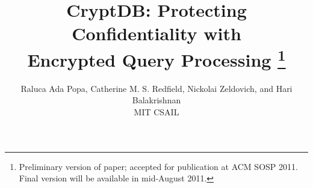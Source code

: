 \documentclass[9pt,twocolumn]{article}
\begin{document}
\title{\bf CryptDB: Protecting Confidentiality with \\
	   Encrypted Query Processing%
    \thanks{Preliminary version of paper; accepted for publication at ACM SOSP 2011.
	    Final version will be available in mid-August 2011.}}
\author{Raluca Ada Popa, Catherine M. S. Redfield,
	Nickolai Zeldovich, and Hari Balakrishnan \\
	MIT CSAIL}
\date{}

\newcommand{\RND}{\textrm{RND}}
\newcommand{\DET}{\textrm{DET}}
\newcommand{\OPE}{\textrm{OPE}}
\newcommand{\OPEJOIN}{\textrm{OPE-JOIN}}
\newcommand{\HOM}{\textrm{HOM}}
\newcommand{\JOIN}{\textrm{JOIN}}
\newcommand{\SEARCH}{\textrm{SEARCH}}

\newcommand{\up}{\texttt{UPDATE}}
\newcommand{\ins}{\texttt{INSERT}}
\newcommand{\del}{\texttt{DELETE}}
\newcommand{\sel}{\texttt{SELECT}}

\newcommand{\rap}[1]{\textcolor{blue}{RAP: #1}}
\newcommand{\hb}[1]{\textcolor{red}{HB: #1}}
\newcommand{\nz}[1]{\textcolor{magenta}{NZ: #1}}
\newcommand{\cmsr}[1]{\textcolor{green}{CR: #1}}
\newcommand{\todo}[1]{\textcolor{red}{#1}}


\newcommand{\tput}{27\%}

\newtheorem{definition}{Definition}
\newtheorem{theorem}{Theorem}

\maketitle







 





\balance
{
\small
\setlength{\bibsep}{3pt}


}
\end{document}
